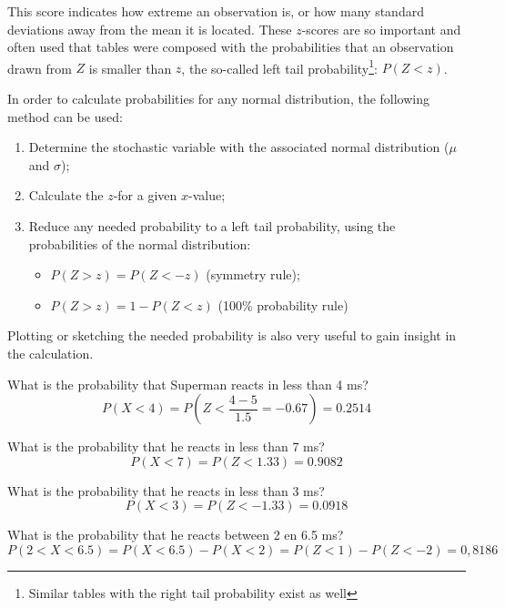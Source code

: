 This score indicates how extreme an observation is, or how many standard deviations away from the mean it is located. These $z$-scores are so important and often used that tables were composed with the probabilities that an observation drawn from $Z$ is smaller than $z$, the so-called left tail probability\footnote{Similar tables with the right tail probability exist as well}: $P(Z<z)$.

In order to calculate probabilities for any normal distribution, the following method can be used:

\begin{enumerate}
  \item Determine the stochastic variable with the associated normal distribution ($\mu$ and $\sigma$);
  \item Calculate the $z$-for a given $x$-value;
  \item Reduce any needed probability to a left tail probability, using the probabilities of the normal distribution:
  \begin{itemize}
    \item $P(Z > z) = P(Z < -z)$ (symmetry rule);
    \item $P(Z > z) = 1 - P(Z < z)$ (100\% probability rule)
  \end{itemize}
\end{enumerate}

Plotting or sketching the needed probability is also very useful to gain insight in the calculation.

\begin{example}
What is the probability that Superman reacts in less than 4 ms?
\[ P(X < 4) = P(Z < \frac{4 - 5}{1.5} = -0.67) = 0.2514 \]
\end{example}

\begin{example}
What is the probability that he reacts in less than 7 ms?
\[ P(X < 7) = P(Z < 1.33) = 0.9082 \]
\end{example}

\begin{example}
What is the probability that he reacts in less than 3 ms?
\[ P(X<3) = P(Z < -1.33) = 0.0918 \]
\end{example}

\begin{example}
What is the probability that he reacts between 2 en 6.5 ms?
\[ P( 2 < X < 6.5) = P(X < 6.5) - P(X < 2) = P(Z < 1) - P(Z < -2) = 0,8186 \]
\end{example}


